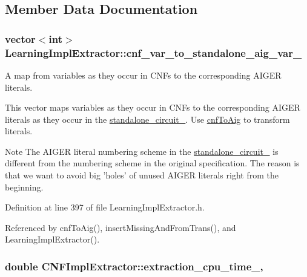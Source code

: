 \subsection{Member Data Documentation}
\hypertarget{classLearningImplExtractor_a2d096ab7181fd608d6ee033f8c9ab8d3}{
\subsubsection[{cnf\-\_\-var\-\_\-to\-\_\-standalone\-\_\-aig\-\_\-var\-\_\-}]{\setlength{\rightskip}{0pt plus 5cm}vector$<$int$>$ Learning\-Impl\-Extractor\-::cnf\-\_\-var\-\_\-to\-\_\-standalone\-\_\-aig\-\_\-var\-\_\-\hspace{0.3cm}{\ttfamily [protected]}}}\label{classLearningImplExtractor_a2d096ab7181fd608d6ee033f8c9ab8d3}


A map from variables as they occur in C\-N\-Fs to the corresponding A\-I\-G\-E\-R literals. 

This vector maps variables as they occur in C\-N\-Fs to the corresponding A\-I\-G\-E\-R literals as they occur in the \hyperlink{classLearningImplExtractor_a17f7c47bf3e84fa5a70930e01a18deb2}{standalone\-\_\-circuit\-\_\-}. Use \hyperlink{classLearningImplExtractor_a88143aa67de5be8848f643cfb2947834}{cnf\-To\-Aig} to transform literals.

\begin{DoxyNote}{Note}
The A\-I\-G\-E\-R literal numbering scheme in the \hyperlink{classLearningImplExtractor_a17f7c47bf3e84fa5a70930e01a18deb2}{standalone\-\_\-circuit\-\_\-} is different from the numbering scheme in the original specification. The reason is that we want to avoid big 'holes' of unused A\-I\-G\-E\-R literals right from the beginning. 
\end{DoxyNote}


Definition at line 397 of file Learning\-Impl\-Extractor.\-h.



Referenced by cnf\-To\-Aig(), insert\-Missing\-And\-From\-Trans(), and Learning\-Impl\-Extractor().

\hypertarget{classCNFImplExtractor_ab8be06d42fd3c4b569ec22cfcf2f508e}{
\subsubsection[{extraction\-\_\-cpu\-\_\-time\-\_\-}]{\setlength{\rightskip}{0pt plus 5cm}double C\-N\-F\-Impl\-Extractor\-::extraction\-\_\-cpu\-\_\-time\-\_\-\hspace{0.3cm}{\ttfamily [protected]}, {\ttfamily [inherited]}}}\label{classCNFImplExtractor_ab8be06d42fd3c4b569ec22cfcf2f508e}


